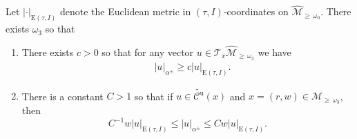 \documentclass[AHL, Unicode, longabstracts,published]{cedram}
\newcommand{\ct}{r}
\newcommand{\inv}{^{-1}}
\newcommand{\unstable}{\text{u}}
\newcommand{\tang}{\mathcal{T}}
\newcommand{\csp}{\mathcal{M}}
\newcommand{\cone}{\mathcal{C}}
\newcommand{\cspl}[1]{\csp_{\ge\,#1}}
\newcommand{\cspil}[1]{\widehat{\csp}_{\ge\,#1}}
\newcommand{\coneu}{\cone^\unstable}
\newcommand{\mconeu}{{\widetilde{\coneu}}}
\newcommand{\law}[1]{\omega_{#1}}
\newcommand{\admPm}{_{\alpha^{\pm}}}
\newcommand*{\relabel}{\renewcommand{\labelenumi}{(\theenumi)}}
\newcommand*{\alphenumi}{\renewcommand*{\theenumi}{\alph{enumi}}\relabel}
\begin{document}
\begin{lemm}\label{LmAlp-Euc}
Let $|\cdot|_{\text{E}(\tau,I)}$ denote the Euclidean metric in $(\tau,I)$-coordinates on $\cspil{\law0}$. There exists $\law3$ so that
\begin{enumerate}\alphenumi
\item\label{lemm4.18.1} There exists $c > 0$ so that for any vector $u\in\tang_{x}\cspil{\law3}$ we have
\begin{align}\label{e_boundAlphaTau}
\quad |u|\admPm \ge
c|u|_{\text{E}(\tau,I)}.
\end{align}
\item\label{lemm4.18.2} There is a constant $C\!>\! 1$ so that if $u\!\in\!\mconeu({x})$ and $x \!=\! (\ct,w)\in\cspl{\law3}$, then
\begin{equation}\label{e_boundAlphaTauCone}
C\inv w|u|_{\text{E}(\tau,I)}\leq |u|\admPm\leq C w|u|_{\text{E}(\tau,I)}.
\end{equation}
\end{enumerate}
\end{lemm}
\end{document}
